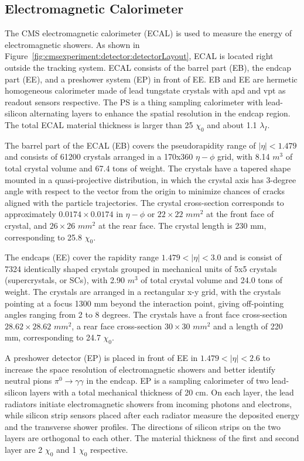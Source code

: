 \subsection{Electromagnetic Calorimeter}
The CMS electromagnetic calorimeter (ECAL) \cite{cms:ecalTdr:CMS:1997ysd} is used to measure the energy of electromagnetic showers. As shown in Figure~\ref{fig:cmsexperiment:detector:detectorLayout}, ECAL is located right outside the tracking system. ECAL consists of the barrel part (EB), the endcap part (EE), and a preshower system (EP) in front of EE. EB and EE are hermetic homogeneous calorimeter made of lead tungstate crystals with \acrfull{apd} and \acrfull{vpt} as readout sensors respective. The PS is a thing sampling calorimeter with lead-silicon alternating layers to enhance the spatial resolution in the endcap region. The total ECAL material thickness is larger than 25 $\chi_0$ and about 1.1 $\lambda_I$.

The barrel part of the ECAL (EB) covers the pseudorapidity range of $|\eta|< 1.479$ and consists of 61200 crystals arranged in a 170x360 $\eta - \phi$ grid, with 8.14 $m^3$ of total crystal volume and 67.4 tons of weight. The crystals have a tapered shape mounted in a quasi-projective distribution, in which the crystal axis has 3-degree angle with respect to the vector from the origin to minimize chances of cracks aligned with the particle trajectories. The crystal cross-section corresponds to approximately $0.0174 \times 0.0174$ in $\eta - \phi$ or $22 \times 22$ $mm^2$ at the front face of crystal, and $26\times26$ $mm^2$ at the rear face. The crystal length is 230 mm, corresponding to 25.8 $\chi_0$.

The endcaps (EE) cover the rapidity range $1.479 < |\eta| < 3.0$ and is consist of 7324 identically shaped crystals grouped in mechanical units of 5x5 crystals (supercrystals, or SCs), with 2.90 $m^3$ of total crystal volume and 24.0 tons of weight. The crystals are arranged in a rectangular x-y grid, with the crystals pointing at a focus 1300 mm beyond the interaction point, giving off-pointing angles ranging from 2 to 8 degrees. The crystals have a front face cross-section $28.62\times28.62$ $mm^2$, a rear face cross-section $30\times30$ $mm^2$ and a length of 220 mm, corresponding to 24.7 $\chi_0$.

A preshower detector (EP) is placed in front of EE in $1.479 < |\eta| < 2.6$ to increase the space resolution of electromagnetic showers and better identify neutral pions $\pi^0 \to \gamma \gamma$ in the endcap. EP is a sampling calorimeter of two lead-silicon layers with a total mechanical thickness of 20 cm. On each layer, the lead radiators initiate electromagnetic showers from incoming photons and electrons, while silicon strip sensors placed after each radiator measure the deposited energy and the transverse shower profiles. The directions of silicon strips on the two layers are orthogonal to each other. The material thickness of the first and second layer are 2 $\chi_0$ and 1 $\chi_0$ respective.



